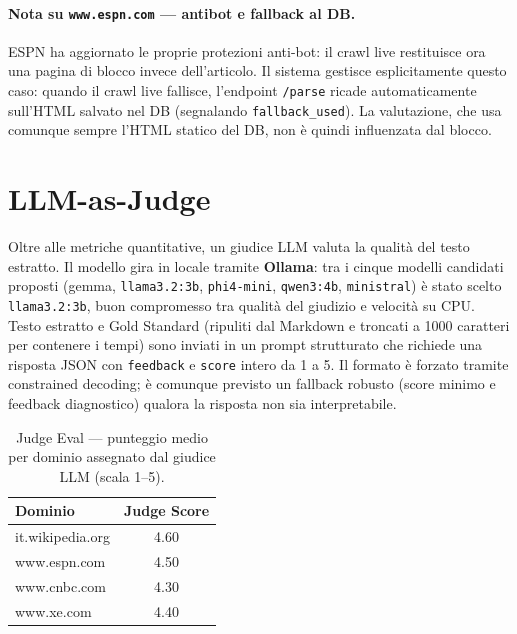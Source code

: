 \documentclass[11pt]{article}
\begin{document}
\paragraph{Nota su \texttt{www.espn.com} — antibot e fallback al DB.} ESPN ha aggiornato le proprie protezioni anti-bot: il crawl live restituisce ora una pagina di blocco invece dell'articolo. Il sistema gestisce esplicitamente questo caso: quando il crawl live fallisce, l'endpoint \texttt{/parse} ricade automaticamente sull'HTML salvato nel DB (segnalando \texttt{fallback\_used}). La valutazione, che usa comunque sempre l'HTML statico del DB, non è quindi influenzata dal blocco.


\section{LLM-as-Judge}

Oltre alle metriche quantitative, un giudice LLM valuta la qualità del testo estratto. Il modello gira in locale tramite \textbf{Ollama}: tra i cinque modelli candidati proposti (gemma, \texttt{llama3.2:3b}, \texttt{phi4-mini}, \texttt{qwen3:4b}, \texttt{ministral}) è stato scelto \texttt{llama3.2:3b}, buon compromesso tra qualità del giudizio e velocità su CPU. Testo estratto e Gold Standard (ripuliti dal Markdown e troncati a 1000 caratteri per contenere i tempi) sono inviati in un prompt strutturato che richiede una risposta JSON con \texttt{feedback} e \texttt{score} intero da 1 a 5. Il formato è forzato tramite constrained decoding; è comunque previsto un fallback robusto (score minimo e feedback diagnostico) qualora la risposta non sia interpretabile.

\begin{table}[h]
\centering
\small
\begin{tabular}{lc}
\toprule
\textbf{Dominio} & \textbf{Judge Score}\\
\midrule
it.wikipedia.org  & 4.60 \\
www.espn.com      & 4.50 \\
www.cnbc.com      & 4.30 \\
www.xe.com        & 4.40 \\
\bottomrule
\end{tabular}
\caption{Judge Eval — punteggio medio per dominio assegnato dal giudice LLM (scala 1--5).}
\end{table}

\end{document}
